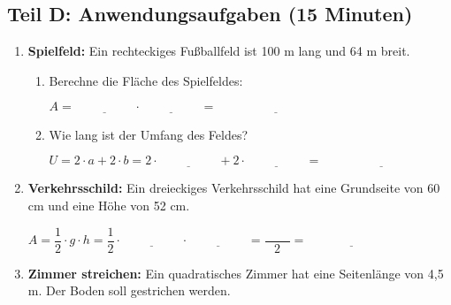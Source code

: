 \subsection*{Teil D: Anwendungsaufgaben (15 Minuten)}

\begin{enumerate}[label=\arabic*.]
    \item \textbf{Spielfeld:}
    Ein rechteckiges Fußballfeld ist 100 m lang und 64 m breit.
    \vspace{0.5cm}

        \begin{enumerate}[label=\alph*)]
        \item Berechne die Fläche des Spielfeldes:

        $A = \underline{\hspace{2cm}} \cdot \underline{\hspace{2cm}} = \underline{\hspace{4cm}}$

        \vspace{0.5cm}

        \item Wie lang ist der Umfang des Feldes?

        $U = 2 \cdot a + 2 \cdot b = 2 \cdot \underline{\hspace{2cm}} + 2 \cdot \underline{\hspace{2cm}} = \underline{\hspace{4cm}}$
    \end{enumerate}

    \vspace{1cm}

    \item \textbf{Verkehrsschild:}
    Ein dreieckiges Verkehrsschild hat eine Grundseite von 60 cm und eine Höhe von 52 cm.
    \vspace{0.5cm}

    $A = \dfrac{1}{2} \cdot g \cdot h = \dfrac{1}{2} \cdot \underline{\hspace{2cm}} \cdot \underline{\hspace{2cm}} = \dfrac{\phantom{0000}}{2} = \underline{\hspace{3cm}}$

    \vspace{1cm}

    \item \textbf{Zimmer streichen:}
    Ein quadratisches Zimmer hat eine Seitenlänge von 4,5 m. Der Boden soll gestrichen werden.
    \vspace{0.5cm}


\end{enumerate}
